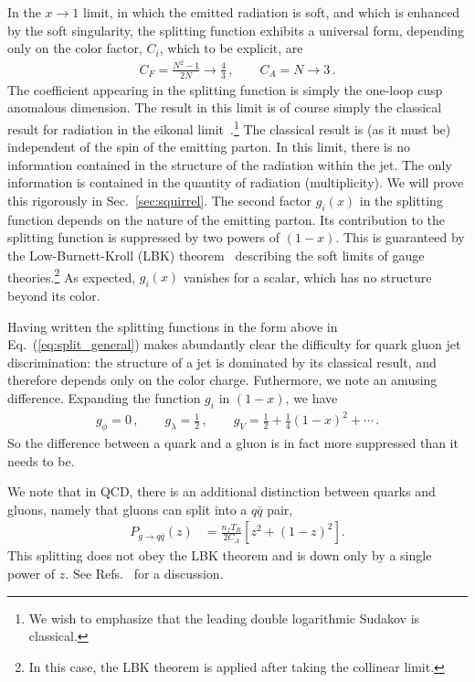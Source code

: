 \documentclass[letterpaper,11pt]{article}
\DeclareRobustCommand{\Sec}[1]{Sec.~\ref{#1}}
\DeclareRobustCommand{\Eq}[1]{Eq.~(\ref{#1})}
\DeclareRobustCommand{\Refs}[1]{Refs.~\cite{#1}}
\begin{document}
In the $x\to 1$ limit, in which the emitted radiation is soft, and which is enhanced by the soft singularity, the splitting function exhibits a universal form, depending only on the color factor, $C_i$, which to be explicit, are
\begin{align}
C_F=\frac{N^2-1}{2N}\to \frac{4}{3}\,, \qquad C_A=N\to 3\,.
\end{align}
The coefficient appearing in the splitting function is simply the one-loop cusp anomalous dimension.
%
The result in this limit is of course simply the classical result for radiation in the eikonal limit~\cite{Levy:1969cr}.\footnote{We wish to emphasize that the leading double logarithmic Sudakov is classical.}
%
The classical result is (as it must be) independent of the spin of the emitting parton.
%
In this limit, there is no information contained in the structure of the radiation within the jet.
%
The only information is contained in the quantity of radiation (multiplicity).
%
We will prove this rigorously in \Sec{sec:squirrel}.
%
The second factor $g_i(x)$ in the splitting function depends on the nature of the emitting parton.
%
Its contribution to the splitting function is suppressed by two powers of $(1-x)$.
%
This is guaranteed by the Low-Burnett-Kroll (LBK) theorem~\cite{Low:1958sn,Burnett:1967km,DelDuca:1990gz} describing the soft limits of gauge theories.\footnote{In this case, the LBK theorem is applied after taking the collinear limit.}
%
As expected, $g_i(x)$ vanishes for a scalar, which has no structure beyond its color.


Having written the splitting functions in the form above in \Eq{eq:split_general} makes abundantly clear the difficulty for quark gluon jet discrimination: the structure of a jet is dominated by its classical result, and therefore depends only on the color charge.
%
Futhermore, we note an amusing difference.
%
Expanding the function $g_i$ in $(1-x)$, we have
\begin{align}
g_\phi=0\,, \qquad g_\lambda=\frac{1}{2}\,, \qquad g_V=\frac{1}{2}+\frac{1}{4}(1-x)^2+\cdots\,.
\end{align}
So the difference between a quark and a gluon is in fact more suppressed than it needs to be.


We note that in QCD, there is an additional distinction between quarks and gluons, namely that gluons can split into a $q\bar q$ pair,
\begin{align}
P_{g\to q\bar q}(z) & = \frac{n_f T_R}{2C_A}[z^2 + (1-z)^2].
\end{align}
This splitting does not obey the LBK theorem and is down only by a single power of $z$.
%
See \Refs{Moult:2016fqy,Boughezal:2016zws,Moult:2017jsg,Boughezal:2018mvf,Moult:2018jjd} for a discussion.
\end{document}
